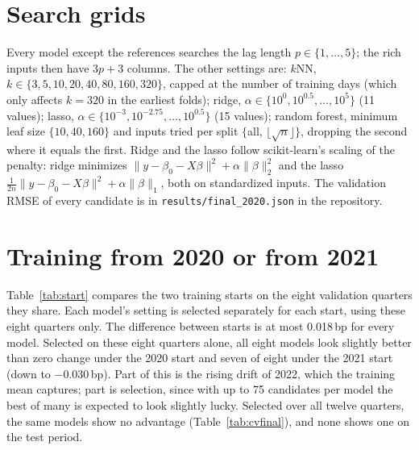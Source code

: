 \documentclass{article}
\newcommand{\gentable}[2][\small]{{#1\setlength{\tabcolsep}{4pt}}}
\begin{document}
\appendix
\section{Search grids}\label{app:grids}
Every model except the references searches the lag length $p \in \{1, \ldots, 5\}$; the rich inputs then have $3p+3$ columns. The other settings are: $k$NN, $k \in \{3, 5, 10, 20, 40, 80, 160, 320\}$, capped at the number of training days (which only affects $k=320$ in the earliest folds); ridge, $\alpha \in \{10^{0}, 10^{0.5}, \ldots, 10^{5}\}$ (11 values); lasso, $\alpha \in \{10^{-3}, 10^{-2.75}, \ldots, 10^{0.5}\}$ (15 values); random forest, minimum leaf size $\{10, 40, 160\}$ and inputs tried per split $\{$all, $\lfloor\sqrt n\rfloor\}$, dropping the second where it equals the first. Ridge and the lasso follow scikit-learn's scaling of the penalty: ridge minimizes $\|y - \beta_0 - X\beta\|^2 + \alpha\|\beta\|_2^2$ and the lasso $\frac{1}{2n}\|y - \beta_0 - X\beta\|^2 + \alpha\|\beta\|_1$, both on standardized inputs. The validation RMSE of every candidate is in \texttt{results/final\_2020.json} in the repository.

\section{Training from 2020 or from 2021}\label{app:start}
Table~\ref{tab:start} compares the two training starts on the eight validation quarters they share. Each model's setting is selected separately for each start, using these eight quarters only. The difference between starts is at most 0.018\,bp for every model. Selected on these eight quarters alone, all eight models look slightly better than zero change under the 2020 start and seven of eight under the 2021 start (down to $-0.030$\,bp). Part of this is the rising drift of 2022, which the training mean captures; part is selection, since with up to 75 candidates per model the best of many is expected to look slightly lucky. Selected over all twelve quarters, the same models show no advantage (Table~\ref{tab:cvfinal}), and none shows one on the test period.

\begin{table}[h]
  \caption{Mean validation RMSE (bp) over 2022\,Q1--2023\,Q4 for each model's best setting, training from 2020 or from 2021 (which drops the year of the COVID-19 shock), the difference (2021 minus 2020), and the paired difference $D$ from zero change under each start. No test data were used.}
  \label{tab:start}
  \centering
  \gentable{tab_trainstart}
\end{table}
\end{document}
